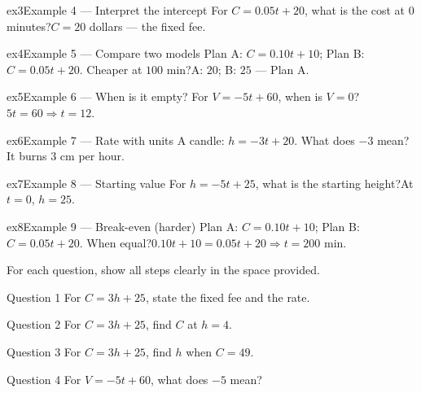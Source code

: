 \documentclass[11pt]{article}
\begin{document}
\begin{example}{ex3}{Example 4 --- Interpret the intercept}
For $C=0.05t+20$, what is the cost at $0$ minutes?\soln $C=20$ dollars — the fixed fee.
\end{example}

\begin{example}{ex4}{Example 5 --- Compare two models}
Plan A: $C=0.10t+10$; Plan B: $C=0.05t+20$. Cheaper at $100$ min?\soln A: $20$; B: $25$ — Plan A.
\end{example}

\begin{example}{ex5}{Example 6 --- When is it empty?}
For $V=-5t+60$, when is $V=0$?\soln $5t=60\Rightarrow t=12$.
\end{example}

\begin{example}{ex6}{Example 7 --- Rate with units}
A candle: $h=-3t+20$. What does $-3$ mean?\soln It burns $3$ cm per hour.
\end{example}

\begin{example}{ex7}{Example 8 --- Starting value}
For $h=-5t+25$, what is the starting height?\soln At $t=0$, $h=25$.
\end{example}

\begin{example}{ex8}{Example 9 --- Break-even (harder)}
Plan A: $C=0.10t+10$; Plan B: $C=0.05t+20$. When equal?\soln $0.10t+10=0.05t+20\Rightarrow t=200$ min.
\end{example}

\clearpage
{}
For each question, show all steps clearly in the space provided.

\begin{qbox}{Question 1}
For $C=3h+25$, state the fixed fee and the rate.\workspace{2.0cm}
\end{qbox}

\begin{qbox}{Question 2}
For $C=3h+25$, find $C$ at $h=4$.\workspace{2.0cm}
\end{qbox}

\begin{qbox}{Question 3}
For $C=3h+25$, find $h$ when $C=49$.\workspace{2.0cm}
\end{qbox}

\begin{qbox}{Question 4}
For $V=-5t+60$, what does $-5$ mean?\workspace{2.0cm}
\end{qbox}
\end{document}

